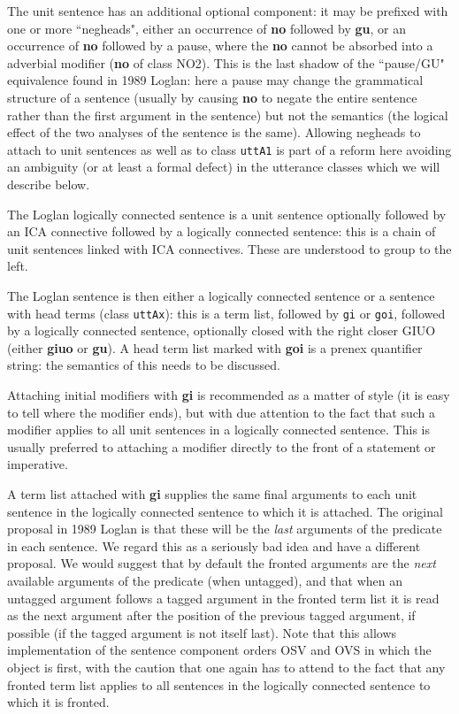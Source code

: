 \documentclass[12pt]{book}
\begin{document}
{The unit sentence has an additional optional component:  it may be prefixed with one or more ``negheads", either an occurrence of {\bf no} followed
by {\bf gu}, or an occurrence of {\bf no} followed by a pause, where the {\bf no} cannot be absorbed into a adverbial modifier ({\bf no} of class NO2).  This is the last shadow of the ``pause/GU" equivalence found in 1989 Loglan:  here a pause may change the grammatical structure of a sentence (usually by causing {\bf no}
to negate the entire sentence rather than the first argument in the sentence) but not the semantics (the logical effect of the two analyses of the sentence is the same).  Allowing negheads to attach to unit sentences as well as to class {\tt uttA1} is part of a reform here avoiding an ambiguity (or at least a formal defect) in the utterance classes which we will describe below.

The Loglan logically connected sentence is  a unit sentence optionally followed by an ICA connective followed by a logically connected sentence:  this is a chain of unit sentences linked with ICA connectives.  These are understood to group to the left.

The Loglan sentence is then either a logically connected sentence or a sentence with head terms (class {\tt uttAx}):  this is a term list, followed by
{\tt gi} or {\tt goi}, followed by a logically connected sentence, optionally closed with the right closer GIUO (either {\bf giuo} or {\bf gu}).   A head term list marked
with {\bf goi} is a prenex quantifier string:  the semantics of this needs to be discussed.

Attaching initial modifiers with {\bf gi} is recommended as a matter of style (it is easy to tell where the modifier ends), but with due attention to the fact that such a modifier applies to all unit sentences in a logically connected sentence.  This is usually preferred to attaching a modifier directly to the front of a statement or imperative.

A term list attached with {\bf gi} supplies the same final arguments to each unit sentence in the logically connected sentence to which it is attached.  The original proposal in 1989 Loglan is that these will be the {\em last\/} arguments of the predicate in each sentence.  We regard this as a seriously bad idea and have a different proposal.  We would suggest that by default the fronted arguments are the {\em next\/} available arguments of the predicate (when untagged), and that when an untagged argument follows a tagged argument in the fronted term list it is read as the next argument after the position of the previous tagged argument, if possible (if the tagged argument is not itself last).  Note that this allows implementation of the sentence component orders OSV and OVS in which the object is first, with the caution that one again has to attend to the fact that any fronted term list applies to all sentences in the logically connected sentence to which it is fronted.

}
\end{document}
